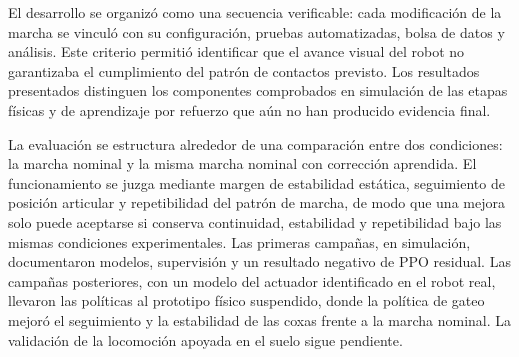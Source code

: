 El desarrollo se organizó como una secuencia verificable: cada modificación de
la marcha se vinculó con su configuración, pruebas automatizadas, bolsa de datos
y análisis. Este criterio permitió identificar que el avance visual del robot
no garantizaba el cumplimiento del patrón de contactos previsto. Los resultados
presentados distinguen los componentes comprobados en simulación de las etapas
físicas y de aprendizaje por refuerzo que aún no han producido evidencia final.

La evaluación se estructura alrededor de una comparación entre dos condiciones:
la marcha nominal y la misma marcha nominal con corrección aprendida. El
funcionamiento se juzga mediante margen de estabilidad estática, seguimiento de
posición articular y repetibilidad del patrón de marcha, de modo que una mejora
solo puede aceptarse si conserva continuidad, estabilidad y repetibilidad bajo
las mismas condiciones experimentales. Las primeras campañas, en simulación,
documentaron modelos, supervisión y un resultado negativo de PPO residual. Las
campañas posteriores, con un modelo del actuador identificado en el robot real,
llevaron las políticas al prototipo físico suspendido, donde la política de gateo
mejoró el seguimiento y la estabilidad de las coxas frente a la marcha nominal.
La validación de la locomoción apoyada en el suelo sigue pendiente.
